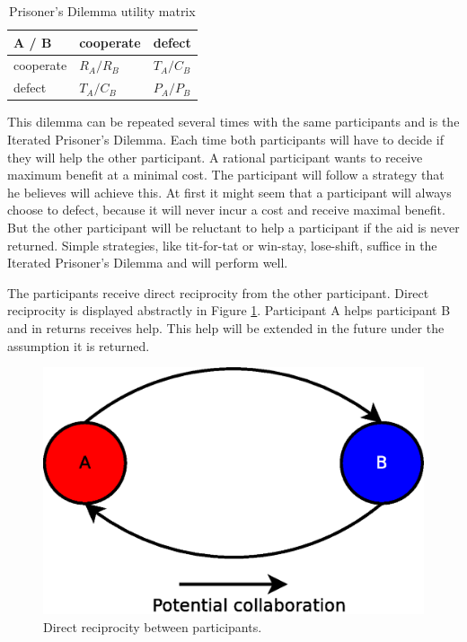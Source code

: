 \begin{table}
\center
	\begin{tabular}{l|ll}
	A / B       & cooperate  & defect     \\ \hline
	cooperate & $R_A /R_B$ & $T_A /C_B$ \\
	defect    & $T_A /C_B$ & $P_A /P_B$
	\end{tabular}
\caption{Prisoner's Dilemma utility matrix}
\label{tab:pd-um}
\end{table}

This dilemma can be repeated several times with the same participants and is the Iterated Prisoner's Dilemma.
Each time both participants will have to decide if they will help the other participant.
A rational participant wants to receive maximum benefit at a minimal cost.
The participant will follow a strategy that he believes will achieve this.
At first it might seem that a participant will always choose to defect,
because it will never incur a cost and receive maximal benefit.
But the other participant will be reluctant to help a participant if the aid is never returned.
Simple strategies, like tit-for-tat or win-stay, lose-shift, suffice in the Iterated Prisoner's Dilemma
and will perform well\cite{Nowak-Cooperation}.

The participants receive direct reciprocity from the other participant\cite{Nowak-Cooperation}.
Direct reciprocity is displayed abstractly in Figure \ref{fig:direct-reciprocity}.
Participant A helps participant B and in returns receives help.
This help will be extended in the future under the assumption it is returned.

\begin{figure}
	\centerline{\includegraphics[scale=0.3]{problemDescription/figs/direct-reciprocity.eps}}
	\caption{Direct reciprocity between participants.}
	\label{fig:direct-reciprocity}
\end{figure}

